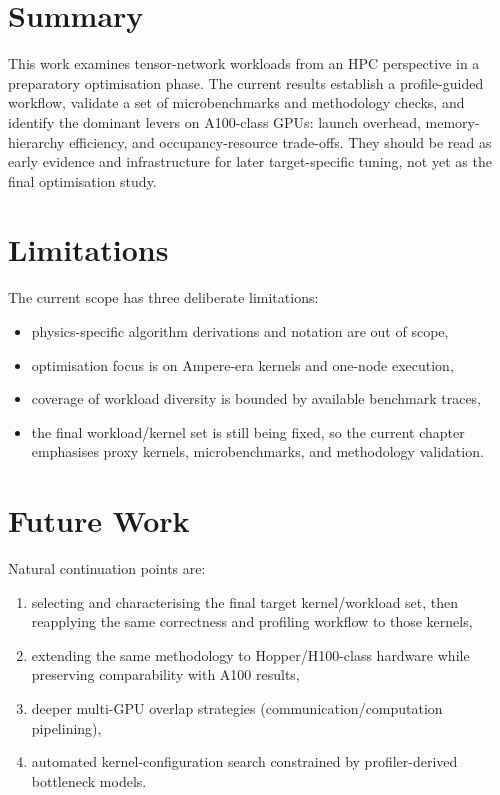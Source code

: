 \section{Summary}\label{sec:summary}

This work examines tensor-network workloads from an HPC perspective in a
preparatory optimisation phase. The current results establish a
profile-guided workflow, validate a set of microbenchmarks and methodology
checks, and identify the dominant levers on A100-class GPUs: launch overhead,
memory-hierarchy efficiency, and occupancy-resource trade-offs. They should be
read as early evidence and infrastructure for later target-specific tuning,
not yet as the final optimisation study.

\section{Limitations}\label{sec:limitations}

The current scope has three deliberate limitations:

\begin{itemize}
  \item physics-specific algorithm derivations and notation are out of scope,
  \item optimisation focus is on Ampere-era kernels and one-node execution,
  \item coverage of workload diversity is bounded by available benchmark traces,
  \item the final workload/kernel set is still being fixed, so the current
    chapter emphasises proxy kernels, microbenchmarks, and methodology
    validation.
\end{itemize}

\section{Future Work}\label{sec:future-work}

Natural continuation points are:

\begin{enumerate}
  \item selecting and characterising the final target kernel/workload set, then
    reapplying the same correctness and profiling workflow to those kernels,
  \item extending the same methodology to Hopper/H100-class hardware while
    preserving comparability with A100 results,
  \item deeper multi-GPU overlap strategies (communication/computation
    pipelining),
  \item automated kernel-configuration search constrained by profiler-derived
    bottleneck models.
\end{enumerate}
